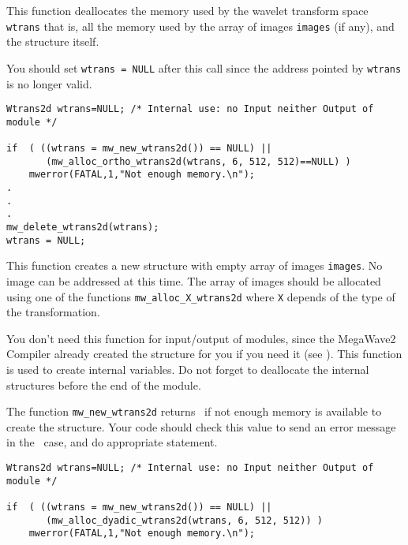 \Description
This function deallocates the memory used by the wavelet transform space \verb+wtrans+ that is, all the memory used by the array of images \verb+images+ (if any), and the structure itself. 

You should set \verb+wtrans = NULL+ after this call since the address pointed
by \verb+wtrans+ is no longer valid.

\Next
\Example
\begin{verbatim}
Wtrans2d wtrans=NULL; /* Internal use: no Input neither Output of module */

if  ( ((wtrans = mw_new_wtrans2d()) == NULL) ||  
       (mw_alloc_ortho_wtrans2d(wtrans, 6, 512, 512)==NULL) )
    mwerror(FATAL,1,"Not enough memory.\n");
.
.
.
mw_delete_wtrans2d(wtrans);
wtrans = NULL;
\end{verbatim}

\newpage %


\Description
This function creates a new \wtransdd structure with empty array of images \verb+images+.
No image can be addressed at this time.
The array of images should  be allocated using one of the functions \verb+mw_alloc_X_wtrans2d+ where \verb+X+ depends of the type of the transformation.

You don't need this function for input/output of modules, since the MegaWave2
Compiler already created the structure for you if you need it (see \volI). 
This function is used to create internal variables.
Do not forget to deallocate the internal structures before the end
of the module.

The function \verb+mw_new_wtrans2d+ returns \Null\ if not enough memory is available to create the structure. Your code should check this value to send an
error message in the \Null\ case, and do appropriate statement.

\Next
\Example
\begin{verbatim}
Wtrans2d wtrans=NULL; /* Internal use: no Input neither Output of module */

if  ( ((wtrans = mw_new_wtrans2d()) == NULL) ||  
       (mw_alloc_dyadic_wtrans2d(wtrans, 6, 512, 512)) )
    mwerror(FATAL,1,"Not enough memory.\n");
\end{verbatim}

\newpage %

